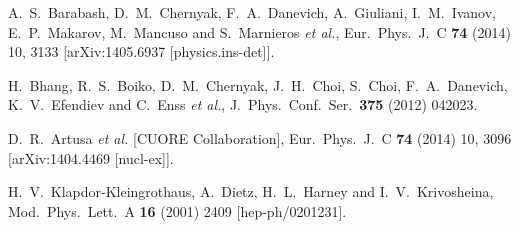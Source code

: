 \documentclass{PoS}
\begin{document}
\begin{thebibliography}{99}
  A.~S.~Barabash, D.~M.~Chernyak, F.~A.~Danevich, A.~Giuliani, I.~M.~Ivanov, E.~P.~Makarov, M.~Mancuso and S.~Marnieros {\it et al.},
  Eur.\ Phys.\ J.\ C {\bf 74} (2014) 10,  3133
  [arXiv:1405.6937 [physics.ins-det]].

  H.~Bhang, R.~S.~Boiko, D.~M.~Chernyak, J.~H.~Choi, S.~Choi, F.~A.~Danevich, K.~V.~Efendiev and C.~Enss {\it et al.},
  J.\ Phys.\ Conf.\ Ser.\  {\bf 375} (2012) 042023.

  D.~R.~Artusa {\it et al.}  [CUORE Collaboration],
  Eur.\ Phys.\ J.\ C {\bf 74} (2014) 10,  3096
  [arXiv:1404.4469 [nucl-ex]].

  H.~V.~Klapdor-Kleingrothaus, A.~Dietz, H.~L.~Harney and I.~V.~Krivosheina,
  Mod.\ Phys.\ Lett.\ A {\bf 16} (2001) 2409
  [hep-ph/0201231].



\end{thebibliography}
\end{document}
